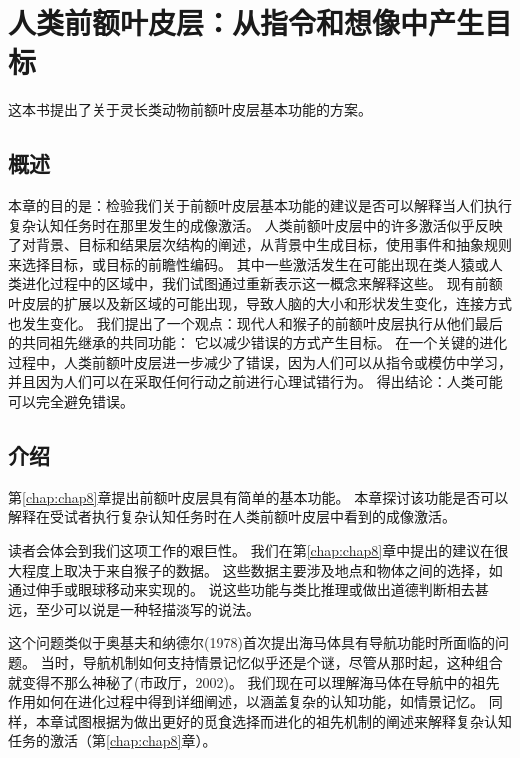 \chapter{人类前额叶皮层：从指令和想像中产生目标} \label{chap:chap9}

这本书提出了关于灵长类动物前额叶皮层基本功能的方案。


\section{概述}

本章的目的是：检验我们关于前额叶皮层基本功能的建议是否可以解释当人们执行复杂认知任务时在那里发生的成像激活。
人类前额叶皮层中的许多激活似乎反映了对背景、目标和结果层次结构的阐述，从背景中生成目标，使用事件和抽象规则来选择目标，或目标的前瞻性编码。
其中一些激活发生在可能出现在类人猿或人类进化过程中的区域中，我们试图通过重新表示这一概念来解释这些。
现有前额叶皮层的扩展以及新区域的可能出现，导致人脑的大小和形状发生变化，连接方式也发生变化。
我们提出了一个观点：现代人和猴子的前额叶皮层执行从他们最后的共同祖先继承的共同功能：
它以减少错误的方式产生目标。
在一个关键的进化过程中，人类前额叶皮层进一步减少了错误，因为人们可以从指令或模仿中学习，并且因为人们可以在采取任何行动之前进行心理试错行为。
得出结论：人类可能可以完全避免错误。



\section{介绍}

第\ref{chap:chap8}章提出前额叶皮层具有简单的基本功能。
本章探讨该功能是否可以解释在受试者执行复杂认知任务时在人类前额叶皮层中看到的成像激活。
\par


读者会体会到我们这项工作的艰巨性。
我们在第\ref{chap:chap8}章中提出的建议在很大程度上取决于来自猴子的数据。
这些数据主要涉及地点和物体之间的选择，如通过伸手或眼球移动来实现的。
说这些功能与类比推理或做出道德判断相去甚远，至少可以说是一种轻描淡写的说法。
\par


这个问题类似于奥基夫和纳德尔(1978)首次提出海马体具有导航功能时所面临的问题。
当时，导航机制如何支持情景记忆似乎还是个谜，尽管从那时起，这种组合就变得不那么神秘了(市政厅，2002)。
我们现在可以理解海马体在导航中的祖先作用如何在进化过程中得到详细阐述，以涵盖复杂的认知功能，如情景记忆。
同样，本章试图根据为做出更好的觅食选择而进化的祖先机制的阐述来解释复杂认知任务的激活（第\ref{chap:chap8}章）。
\par


